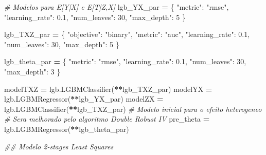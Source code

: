\documentclass[
]{article}
\newenvironment{Shaded}{\begin{snugshade}}{\end{snugshade}}
\newcommand{\CommentTok}[1]{\textcolor[rgb]{0.56,0.35,0.01}{\textit{#1}}}
\newcommand{\DecValTok}[1]{\textcolor[rgb]{0.00,0.00,0.81}{#1}}
\newcommand{\FloatTok}[1]{\textcolor[rgb]{0.00,0.00,0.81}{#1}}
\newcommand{\NormalTok}[1]{#1}
\newcommand{\OperatorTok}[1]{\textcolor[rgb]{0.81,0.36,0.00}{\textbf{#1}}}
\newcommand{\StringTok}[1]{\textcolor[rgb]{0.31,0.60,0.02}{#1}}
\begin{document}
\begin{Shaded}
\begin{Highlighting}[]
{{\CommentTok{# Modelos para E[Y|X] e E[T|Z,X]}
\NormalTok{lgb_YX_par }\OperatorTok{=}\NormalTok{ \{}
    \StringTok{"metric"}\NormalTok{: }\StringTok{"rmse"}\NormalTok{,}
    \StringTok{"learning_rate"}\NormalTok{: }\FloatTok{0.1}\NormalTok{,}
    \StringTok{"num_leaves"}\NormalTok{: }\DecValTok{30}\NormalTok{,}
    \StringTok{"max_depth"}\NormalTok{: }\DecValTok{5}
\NormalTok{\}}

\NormalTok{lgb_TXZ_par }\OperatorTok{=}\NormalTok{ \{}
    \StringTok{"objective"}\NormalTok{: }\StringTok{"binary"}\NormalTok{,}
    \StringTok{"metric"}\NormalTok{: }\StringTok{"auc"}\NormalTok{,}
    \StringTok{"learning_rate"}\NormalTok{: }\FloatTok{0.1}\NormalTok{,}
    \StringTok{"num_leaves"}\NormalTok{: }\DecValTok{30}\NormalTok{,}
    \StringTok{"max_depth"}\NormalTok{: }\DecValTok{5}
\NormalTok{\}}

\NormalTok{lgb_theta_par }\OperatorTok{=}\NormalTok{ \{}
    \StringTok{"metric"}\NormalTok{: }\StringTok{"rmse"}\NormalTok{,}
    \StringTok{"learning_rate"}\NormalTok{: }\FloatTok{0.1}\NormalTok{,}
    \StringTok{"num_leaves"}\NormalTok{: }\DecValTok{30}\NormalTok{,}
    \StringTok{"max_depth"}\NormalTok{: }\DecValTok{3}
\NormalTok{\}}

\NormalTok{modelTXZ }\OperatorTok{=}\NormalTok{ lgb.LGBMClassifier(}\OperatorTok{**}\NormalTok{lgb_TXZ_par)}
\NormalTok{modelYX }\OperatorTok{=}\NormalTok{ lgb.LGBMRegressor(}\OperatorTok{**}\NormalTok{lgb_YX_par)}
\NormalTok{modelZX }\OperatorTok{=}\NormalTok{ lgb.LGBMClassifier(}\OperatorTok{**}\NormalTok{lgb_TXZ_par)}
\CommentTok{# Modelo inicial para o efeito heterogeneo}
\CommentTok{# Sera melhorado pelo algoritmo Double Robust IV}
\NormalTok{pre_theta }\OperatorTok{=}\NormalTok{ lgb.LGBMRegressor(}\OperatorTok{**}\NormalTok{lgb_theta_par)}

\CommentTok{## Modelo 2-stages Least Squares}

}}
\end{Highlighting}
\end{Shaded}
\end{document}
